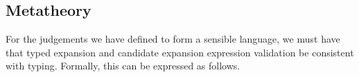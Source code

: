 



\subsection{Metatheory}
For the judgements we have defined to form a sensible language, we must have that typed expansion and candidate expansion expression validation be consistent with typing. Formally, this can be expressed as follows.


